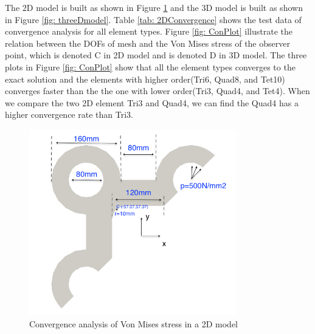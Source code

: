 The 2D model is built as shown in Figure \ref{fig: twoDmodel} and the 3D model is built as shown in Figure \ref{fig: threeDmodel}. Table \ref{tab: 2DConvergence} shows the test data of convergence analysis for all element types. Figure \ref{fig: ConPlot} illustrate the relation between the DOFs of mesh and the Von Mises stress of the observer point, which is denoted C in 2D model and is denoted D in 3D model. The three plots in Figure \ref{fig: ConPlot} show that all the element types converges to the exact solution and the elements with higher order(Tri6, Quad8, and Tet10) converges faster than the the one with lower order(Tri3, Quad4, and Tet4). When we compare the two 2D element Tri3 and Quad4, we can find the Quad4 has a higher convergence rate than Tri3. 

\begin{figure}[htbp]
	\begin{center}	
		\includegraphics[width=9cm,clip]{twoDmodel.png} 			
		\caption{Convergence analysis of Von Mises stress in a 2D model} \label{fig: twoDmodel}
	\end{center}
\end{figure}


